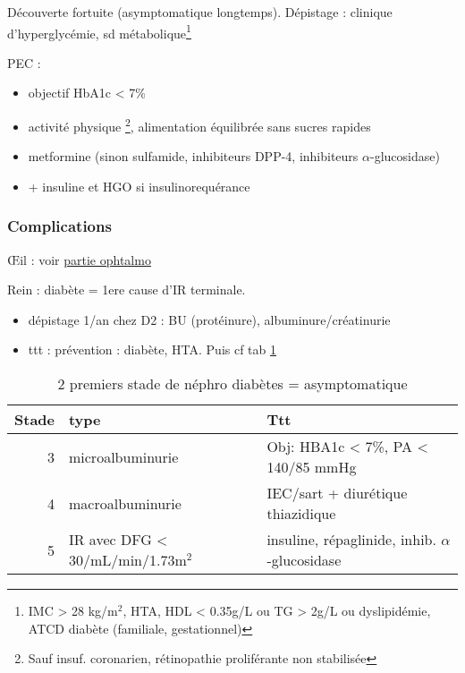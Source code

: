 \documentclass[11pt]{article}
\begin{document}
Découverte fortuite (asymptomatique longtemps). 
Dépistage : clinique d'hyperglycémie, sd métabolique\footnote{IMC > 28 kg/m\(^{\text{2}}\), HTA, HDL < 0.35g/L ou TG > 2g/L ou dyslipidémie, ATCD
diabète (familiale, gestationnel)}

PEC :
\begin{itemize}
\item objectif HbA1c < 7\%
\item activité physique \footnote{Sauf insuf. coronarien, rétinopathie proliférante non stabilisée}, alimentation équilibrée sans sucres rapides
\item metformine (sinon sulfamide, inhibiteurs DPP-4, inhibiteurs
\(\alpha\)-glucosidase)
\item + insuline et HGO si insulinorequérance
\end{itemize}

\subsubsection{Complications}
\label{sec:org142ed39}
\OE{}il : voir \hyperref[orgb19a48c]{partie ophtalmo}

Rein : diabète = 1ere cause d'IR terminale. 
\begin{itemize}
\item dépistage 1/an chez D2 : BU (protéinure), albuminure/créatinurie
\item ttt : prévention : diabète, HTA. Puis cf tab \ref{tab:org08e784f}
\end{itemize}
\begin{table}[htbp]
\caption{\label{tab:org08e784f}
2 premiers stade de néphro diabètes = asymptomatique}
\centering
\begin{tabular}{rll}
Stade & type & Ttt\\
\hline
3 & microalbuminurie & Obj: HBA1c < 7\%, PA < 140/85 mmHg\\
4 & macroalbuminurie & IEC/sart + diurétique thiazidique\\
5 & IR avec DFG < 30/mL/min/1.73m\(^{\text{2}}\) & insuline, répaglinide, inhib. \(\alpha\)-glucosidase\\
\end{tabular}
\end{table}
\end{document}
